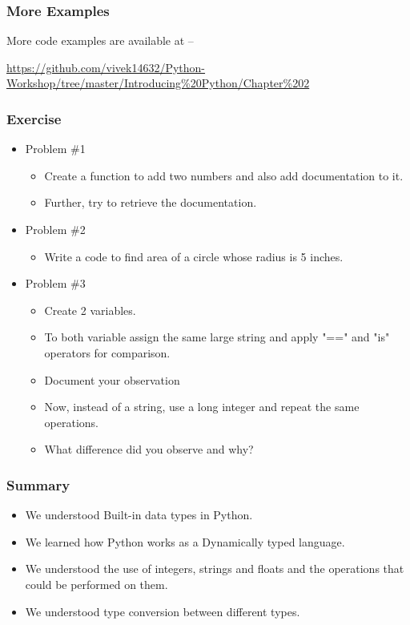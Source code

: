 \documentclass{beamer}
\begin{document}
\begin{frame}
\frametitle{More Examples}
More code examples are available at --
 
\url{https://github.com/vivek14632/Python-Workshop/tree/master/Introducing\%20Python/Chapter\%202}
\end{frame}

\begin{frame}
\frametitle{Exercise}
\begin{itemize}
\item Problem \#1
\begin{itemize}
\item Create a function to add two numbers and also add documentation to it.
\item Further, try to retrieve the documentation.
\end{itemize}
\item Problem \#2
\begin{itemize}
\item Write a code to find area of a circle whose radius is 5 inches.
\end{itemize}
\item Problem \#3
\begin{itemize}
\item Create 2 variables.
\item To both variable assign the same large string and apply "==" and "is" operators for comparison.
\item Document your observation
\item Now, instead of a string, use a long integer and repeat the same operations.
\item What difference did you observe and why?
\end{itemize}
\end{itemize}
\end{frame}
\begin{frame}
\frametitle{Summary}
\begin{itemize}
\item We understood Built-in data types in Python.
\item We learned how Python works as a Dynamically typed language.
\item We understood the use of integers, strings and floats and the operations that could be performed on them.
\item We understood type conversion between different types.
\end{itemize}
\end{frame}
\end{document}
